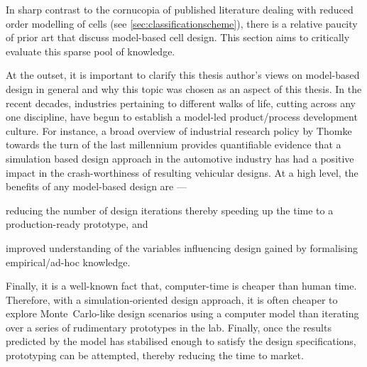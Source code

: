 



In sharp contrast to the cornucopia of published literature dealing with reduced
order  modelling  of cells  (see  \cref{sec:classificationscheme}),  there is  a
relative paucity of prior art that discuss model-based cell design. This section
aims to critically evaluate this sparse pool of knowledge.

At  the  outset, it  is  important  to clarify  this  thesis  author's views  on
model-based design in general and why this topic was chosen as an aspect of this
thesis.  In  the  recent  decades,  industries  pertaining  to  different  walks
of  life,  cutting  across  any  one  discipline,  have  begun  to  establish  a
model-led product/process development culture. For instance, a broad overview of
industrial  research  policy by  Thomke~\cite{Thomke1998}  towards  the turn  of
the  last millennium  provides  quantifiable evidence  that  a simulation  based
design approach  in the  automotive industry  has had a  positive impact  in the
crash-worthiness of resulting  vehicular designs. At a high  level, the benefits
of any model-based design are ---
\begin{enumerate*}[label=\itshape\alph*\upshape)]
    \item reducing the number of design iterations thereby speeding up the time to a production-ready prototype, and
    \item improved understanding of the variables influencing design gained by formalising empirical/ad-hoc knowledge.
\end{enumerate*}
Finally, it is a well-known fact that, computer-time is cheaper than human time.
Therefore, with  a simulation-oriented design  approach, it is often  cheaper to
explore Monte~Carlo-like design scenarios  using a computer model than iterating
over  a  series  of  rudimentary  prototypes  in  the  lab.  Finally,  once  the
results  predicted by  the model  has stabilised  enough to  satisfy the  design
specifications,  prototyping can  be  attempted, thereby  reducing  the time  to
market.

